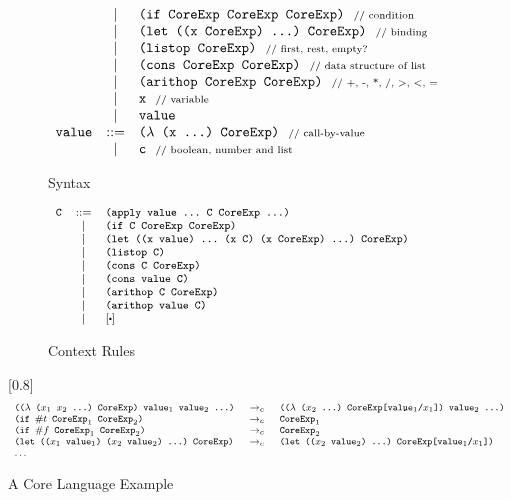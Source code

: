 \begin{figure*}[thb]
\begin{subfigure}{0.45\linewidth}
\[{\begin{array}{lcl}
		&|& \mbox{\tt (if~CoreExp~CoreExp~CoreExp)} ~~\mbox{{\scriptsize // condition}}\\
		&|& \mbox{\tt (let~((x~CoreExp)~...)~CoreExp)} ~~\mbox{{\scriptsize // binding}}\\
		&|& \mbox{\tt (listop~CoreExp)} ~~\mbox{{\scriptsize // first, rest, empty?}}\\
		&|& \mbox{\tt (cons~CoreExp~CoreExp)} ~~\mbox{{\scriptsize // data structure of list}}\\
		&|& \mbox{\tt (arithop~CoreExp~CoreExp)} ~~\mbox{{\scriptsize // +, -, *, /, >, <, =}}\\
		&|& \mbox{\tt x} ~~\mbox{{\scriptsize // variable}}\\
		&|& \mbox{\tt value}\\
		\mbox{\tt value} &::=& \mbox{\tt ($\lambda$~(x~...)~CoreExp)} ~~\mbox{{\scriptsize // call-by-value}}\\
		&|& \mbox{\tt c} ~~\mbox{{\scriptsize // boolean, number and list}}
		\end{array}
}
\]
\caption{Syntax}
\end{subfigure}
\begin{subfigure}{0.5\linewidth}
\[
{\footnotesize
		\begin{array}{lcl}	
		\Code{C} &::=& \Code{(apply~value~...~C~CoreExp~...)}\\
		&|& \Code{(if~C~CoreExp~CoreExp)}\\
		&|& \Code{(let~((x~value)~...~(x~C)~(x~CoreExp)~...)~CoreExp)}\\
		&|& \Code{(listop~C)}\\
		&|& \Code{(cons~C~CoreExp)}\\
		&|& \Code{(cons~value~C)}\\
		&|& \Code{(arithop~C~CoreExp)}\\
		&|& \Code{(arithop~value~C)}\\
		&|& [\bigcdot]
		\end{array}
}
\]
\caption{Context Rules}
\end{subfigure}


[0.8\linewidth]{
\[
{\footnotesize
		\begin{array}{lcl}	
		\texttt{(($\lambda$~($x_1$~$x_2$~...)~CoreExp)~$\mbox{\tt value}_1$~$\mbox{\tt value}_2$~...)} &~\rightarrow_c~& \texttt{(($\lambda$~($x_2$~...)~CoreExp[$\mbox{\tt value}_1$/$x_1$])~$\mbox{\tt value}_2$~...)}\\

		\texttt{(if~$\#t$~$\mbox{\tt CoreExp}_1$~$\mbox{\tt CoreExp}_2$)}&~\rightarrow_c~& \texttt{$\mbox{\tt CoreExp}_1$}\\
		\texttt{(if~$\#f$~$\mbox{\tt CoreExp}_1$~$\mbox{\tt CoreExp}_2$)}&~\rightarrow_c~& \texttt{$\mbox{\tt CoreExp}_2$}\\
		\texttt{(let~(($x_1$~$\mbox{\tt value}_1$)~($x_2$~$\mbox{\tt value}_2$)~...)~CoreExp)}&~\rightarrow_c~&\texttt{(let~(($x_2$~$\mbox{\tt value}_2$)~...)~CoreExp[$\mbox{\tt value}_1$/$x_1$])}\\
		\ldots&&
		\end{array}
}
\]
}



\caption{A Core Language Example}
\label{fig:core}
\end{figure*}



